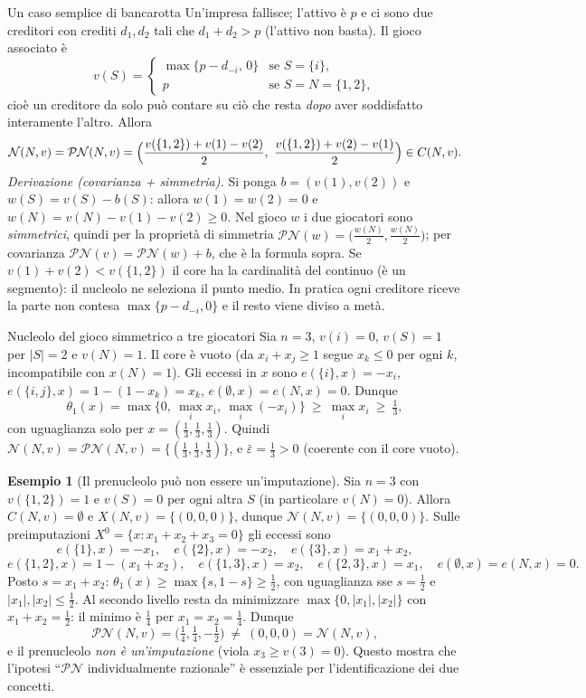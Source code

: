 \documentclass[12pt,a4paper,twoside]{book}
\theoremstyle{plain}
\theoremstyle{definition}
\newtheorem{example}[theorem]{Esempio}
\begin{document}
\begin{exbox}{Un caso semplice di bancarotta}
Un'impresa fallisce; l'attivo è $p$ e ci sono due creditori con crediti
$d_1,d_2$ tali che $d_1+d_2>p$ (l'attivo non basta). Il gioco associato è
\[
  v(S)=\begin{cases}
    \max\{p-d_{-i},\,0\} & \text{se } S=\{i\},\\
    p & \text{se } S=N=\{1,2\},
  \end{cases}
\]
cioè un creditore da solo può contare su ciò che resta \emph{dopo} aver
soddisfatto interamente l'altro. Allora
\[
  \mathcal{N}(N,v)=\mathcal{PN}(N,v)
  =\Bigl(\frac{v(\{1,2\})+v(1)-v(2)}{2},\ \frac{v(\{1,2\})+v(2)-v(1)}{2}\Bigr)\in C(N,v).
\]
\textit{Derivazione (covarianza + simmetria).} Si ponga $b=(v(1),v(2))$ e
$w(S)=v(S)-b(S)$: allora $w(1)=w(2)=0$ e $w(N)=v(N)-v(1)-v(2)\ge 0$. Nel gioco
$w$ i due giocatori sono \emph{simmetrici}, quindi per la proprietà di simmetria
$\mathcal{PN}(w)=\bigl(\tfrac{w(N)}{2},\tfrac{w(N)}{2}\bigr)$; per covarianza
$\mathcal{PN}(v)=\mathcal{PN}(w)+b$, che è la formula sopra. Se
$v(1)+v(2)<v(\{1,2\})$ il core ha la cardinalità del continuo (è un segmento):
il nucleolo ne seleziona il punto medio. In pratica ogni creditore riceve la
parte non contesa $\max\{p-d_{-i},0\}$ e il resto viene diviso a metà.
\end{exbox}

\begin{exbox}{Nucleolo del gioco simmetrico a tre giocatori}
Sia $n=3$, $v(i)=0$, $v(S)=1$ per $|S|=2$ e $v(N)=1$. Il core è vuoto (da
$x_i+x_j\ge 1$ segue $x_k\le 0$ per ogni $k$, incompatibile con $x(N)=1$).
Gli eccessi in $x$ sono $e(\{i\},x)=-x_i$, $e(\{i,j\},x)=1-(1-x_k)=x_k$,
$e(\emptyset,x)=e(N,x)=0$. Dunque
\[
  \theta_1(x)=\max\{0,\ \max_i x_i,\ \max_i(-x_i)\}\ \ge\ \max_i x_i\ \ge\ \tfrac13,
\]
con uguaglianza solo per $x=(\tfrac13,\tfrac13,\tfrac13)$. Quindi
$\mathcal{N}(N,v)=\mathcal{PN}(N,v)=\{(\tfrac13,\tfrac13,\tfrac13)\}$, e
$\bar\varepsilon=\tfrac13>0$ (coerente con il core vuoto).
\end{exbox}

\begin{example}[Il prenucleolo può non essere un'imputazione]
\label{ex:pn-non-imp}
Sia $n=3$ con $v(\{1,2\})=1$ e $v(S)=0$ per ogni altra $S$ (in particolare
$v(N)=0$). Allora $C(N,v)=\emptyset$ e $X(N,v)=\{(0,0,0)\}$, dunque
$\mathcal{N}(N,v)=\{(0,0,0)\}$. Sulle preimputazioni
$X^{0}=\{x:x_1+x_2+x_3=0\}$ gli eccessi sono
\[
  e(\{1\},x)=-x_1,\quad e(\{2\},x)=-x_2,\quad e(\{3\},x)=x_1+x_2,
\]
\[
  e(\{1,2\},x)=1-(x_1+x_2),\quad e(\{1,3\},x)=x_2,\quad e(\{2,3\},x)=x_1,\quad
  e(\emptyset,x)=e(N,x)=0 .
\]
Posto $s=x_1+x_2$: $\theta_1(x)\ge\max\{s,1-s\}\ge\tfrac12$, con uguaglianza sse
$s=\tfrac12$ e $|x_1|,|x_2|\le\tfrac12$. Al secondo livello resta da minimizzare
$\max\{0,|x_1|,|x_2|\}$ con $x_1+x_2=\tfrac12$: il minimo è $\tfrac14$ per
$x_1=x_2=\tfrac14$. Dunque
\[
  \mathcal{PN}(N,v)=\bigl(\tfrac14,\tfrac14,-\tfrac12\bigr)\ \ne\ (0,0,0)=\mathcal{N}(N,v),
\]
e il prenucleolo \emph{non è un'imputazione} (viola $x_3\ge v(3)=0$). Questo
mostra che l'ipotesi ``$\mathcal{PN}$ individualmente razionale'' è essenziale
per l'identificazione dei due concetti.
\end{example}
\end{document}
